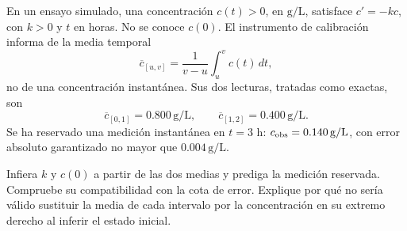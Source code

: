 En un ensayo simulado, una concentración \(c(t)>0\), en \(\mathrm{g/L}\), satisface \(c'=-kc\), con \(k>0\) y \(t\) en horas. No se conoce \(c(0)\). El instrumento de calibración informa de la media temporal
\[
\overline c_{[u,v]}=\frac1{v-u}\int_u^v c(t)\,dt,
\]
no de una concentración instantánea. Sus dos lecturas, tratadas como exactas, son
\[
\overline c_{[0,1]}=0.800\,\mathrm{g/L},\qquad
\overline c_{[1,2]}=0.400\,\mathrm{g/L}.
\]
Se ha reservado una medición instantánea en \(t=3\) h: \(c_{\rm obs}=0.140\,\mathrm{g/L}\), con error absoluto garantizado no mayor que \(0.004\,\mathrm{g/L}\).

Infiera \(k\) y \(c(0)\) a partir de las dos medias y prediga la medición reservada. Compruebe su compatibilidad con la cota de error. Explique por qué no sería válido sustituir la media de cada intervalo por la concentración en su extremo derecho al inferir el estado inicial.
